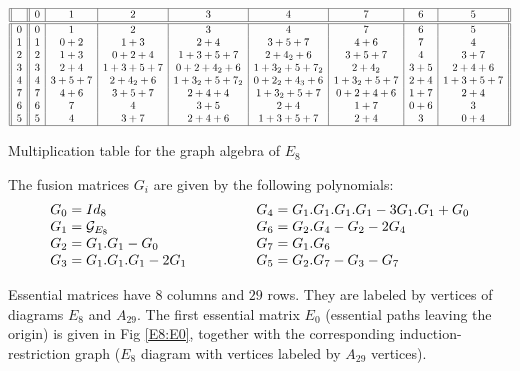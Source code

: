 \documentclass[a4paper,11pt]{article}
\begin{document}
\begin{table}[hhh]
\scriptsize
$$
\begin{array}{||c||c|c|c|c|c|c|c|c||}
\hline
{}& 0 & 1  & 2 & 3 & 4 & 7 & 6 & 5 \\
\hline
\hline
0 & 0 & 1     & 2       & 3           &   4         &  7        & 6
& 5       \\
1 & 1 & 0+2   & 1+3     & 2+4         & 3+5+7       & 4+6       & 7
& 4       \\
2 & 2 & 1+3   & 0+2+4   & 1+3+5+7     & 2+4_2+6     & 3+5+7     & 4
& 3+7     \\
3 & 3 & 2+4   & 1+3+5+7 & 0+2+4_2+6   & 1+3_2+5+7_2 & 2+4_2     & 3+5
& 2+4+6   \\
4 & 4 & 3+5+7 & 2+4_2+6 & 1+3_2+5+7_2 & 0+2_2+4_3+6 & 1+3_2+5+7 & 2+4
& 1+3+5+7 \\
7 & 7 & 4+6   & 3+5+7   & 2+4+4       & 1+3_2+5+7   & 0+2+4+6   & 1+7
& 2+4     \\
6 & 6 & 7     & 4       & 3+5         & 2+4         & 1+7       & 0+6
& 3       \\
5 & 5 & 4     & 3+7     & 2+4+6       & 1+3+5+7     & 2+4       & 3
& 0+4     \\
\hline
\end{array}
$$
\normalsize
\caption{Multiplication table for the graph algebra of $E_8$}
\end{table}

The fusion matrices $G_{i}$ are given by the following polynomials:
$$
\begin{array}{ll}
G_0 = Id_8   &
G_4 = G_1.G_1.G_1.G_1 - 3 G_1.G_1 + G_0 \\
G_1 = {\cal G}_{E_8} &
G_6 = G_2.G_4 - G_2 - 2 G_4 \\
G_2 = G_1.G_1 - G_0 &
G_7 = G_1.G_6 \\
G_3 = G_1.G_1.G_1 - 2 G_1 \qquad \qquad &
G_5 = G_2.G_7 - G_3 - G_7
\end{array}
$$

Essential matrices have $8$ columns and $29$ rows. They are labeled
by vertices of diagrams  $E_{8}$ and $A_{29}$.
The first essential matrix $E_{0}$ (essential paths leaving the
origin) is given in Fig \ref{E8:E0}, together with the corresponding
induction-restriction graph ($E_8$ diagram with vertices labeled by
$A_{29}$ vertices).
\end{document}
